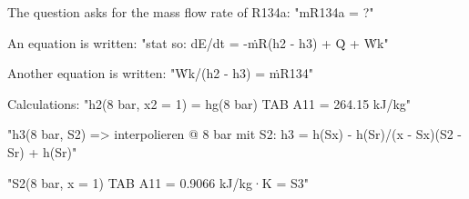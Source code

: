 The question asks for the mass flow rate of R134a: "mR134a = ?"  

An equation is written:  
"stat so: dE/dt = -ṁR(h2 - h3) + Q̇ + Ẇk"  

Another equation is written:  
"Ẇk/(h2 - h3) = ṁR134"  

Calculations:  
"h2(8 bar, x2 = 1) = hg(8 bar) TAB A11 = 264.15 kJ/kg"  

"h3(8 bar, S2) => interpolieren @ 8 bar mit S2: h3 = h(Sx) - h(Sr)/(x - Sx)(S2 - Sr) + h(Sr)"  

"S2(8 bar, x = 1) TAB A11 = 0.9066 kJ/kg·K = S3"